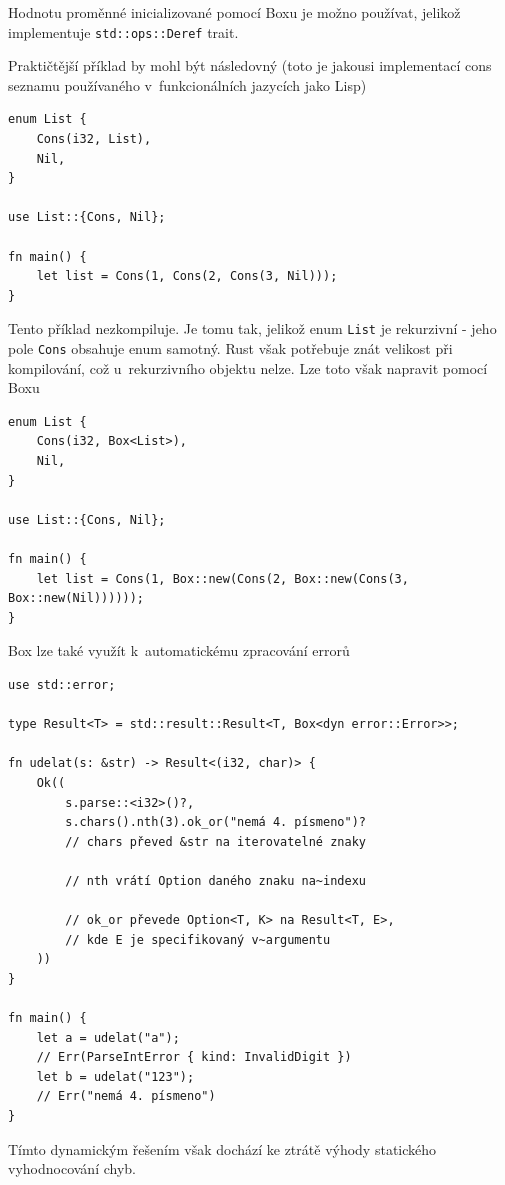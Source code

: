 \documentclass[a4paper, 12pt]{article} %
\newcommand{\rust}[1]{\texttt{#1}}
\begin{document}
            Hodnotu proměnné inicializované pomocí Boxu je možno používat, jelikož implementuje \rust{std::ops::Deref} trait.
            
            Praktičtější příklad by mohl být následovný (toto je jakousi implementací cons seznamu používaného v~funkcionálních jazycích jako Lisp)
            \begin{verbatim}
enum List {
    Cons(i32, List),
    Nil,
}

use List::{Cons, Nil};

fn main() {
    let list = Cons(1, Cons(2, Cons(3, Nil)));
}
            \end{verbatim}
            
            Tento příklad nezkompiluje. Je tomu tak, jelikož enum \rust{List} je rekurzivní - jeho pole \rust{Cons} obsahuje enum samotný. Rust však potřebuje znát velikost při kompilování, což u~rekurzivního objektu nelze. Lze toto však napravit pomocí Boxu
            \begin{verbatim}
enum List {
    Cons(i32, Box<List>),
    Nil,
}

use List::{Cons, Nil};

fn main() {
    let list = Cons(1, Box::new(Cons(2, Box::new(Cons(3, Box::new(Nil))))));
}
            \end{verbatim}
            \cite{box}
            
            Box lze také využít k~automatickému zpracování errorů
            \begin{verbatim}
use std::error;

type Result<T> = std::result::Result<T, Box<dyn error::Error>>;

fn udelat(s: &str) -> Result<(i32, char)> {
    Ok((
        s.parse::<i32>()?,
        s.chars().nth(3).ok_or("nemá 4. písmeno")?
        // chars převed &str na iterovatelné znaky

        // nth vrátí Option daného znaku na~indexu
        
        // ok_or převede Option<T, K> na Result<T, E>,
        // kde E je specifikovaný v~argumentu
    ))
}

fn main() {
    let a = udelat("a");
    // Err(ParseIntError { kind: InvalidDigit })
    let b = udelat("123");
    // Err("nemá 4. písmeno")
}
            \end{verbatim}
            
            Tímto dynamickým řešením však dochází ke ztrátě výhody statického vyhodnocování chyb.\cite{box_err}
            
\end{document}
